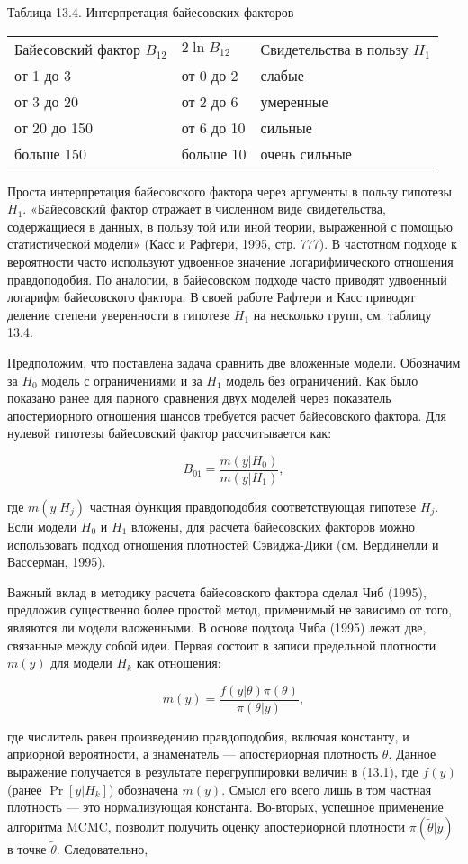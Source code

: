 Таблица 13.4. Интерпретация байесовских факторов 

\begin{tabular}{p{4cm}p{3cm}p{3cm}}
\hline 
Байесовский фактор $B_{12}$ & $2\ln B_{12}$ & Свидетельства в пользу $H_1$ \\
от 1 до 3 & от 0 до 2 & слабые \\
от 3 до 20 & от 2 до 6 & умеренные \\
от 20 до 150 & от 6 до 10 & сильные \\
больше 150 & больше 10 & очень сильные 
\end{tabular}


Проста интерпретация байесовского фактора через аргументы в пользу гипотезы $H_1$. «Байесовский фактор отражает в численном виде свидетельства, содержащиеся в данных, в пользу той или иной теории, выраженной с помощью статистической модели» (Касс и Рафтери, 1995, стр. 777). В частотном подходе к вероятности часто используют удвоенное значение логарифмического отношения правдоподобия. По аналогии, в байесовском подходе часто приводят удвоенный логарифм  байесовского фактора. В своей работе Рафтери и Касс приводят деление степени уверенности в гипотезе $H_1$ на несколько групп,  см.  таблицу 13.4.

Предположим, что поставлена задача сравнить две вложенные модели. Обозначим за $H_0$ модель с ограничениями и за $H_1$ модель без ограничений. Как было показано ранее для парного сравнения двух моделей через показатель апостериорного отношения шансов требуется расчет байесовского фактора. Для нулевой гипотезы байесовский фактор рассчитывается как:

\[
B_{01}=\frac{m(y|H_0)}{m(y|H_1)},
\]

где $m(y|H_j)$ частная функция правдоподобия соответствующая гипотезе $H_j$. Если модели $H_0$ и $H_1$ вложены, для расчета байесовских факторов можно использовать подход отношения  плотностей Сэвиджа-Дики (см. Вердинелли и Вассерман, 1995).

Важный вклад в методику расчета байесовского фактора сделал Чиб (1995), предложив существенно более простой метод, применимый не зависимо от того, являются ли модели вложенными. В основе подхода Чиба (1995) лежат две, связанные между собой идеи. Первая состоит в записи предельной плотности $m(y)$ для модели $H_k$ как отношения:

\[
m(y)=\dfrac{f(y|\theta)\pi(\theta)}{\pi(\theta|y)},
\]

где числитель равен произведению правдоподобия, включая константу, и априорной вероятности, а знаменатель --- апостериорная плотность $\theta$.
Данное выражение получается в результате перегруппировки величин в (13.1), где $f(y)$ (ранее $\Pr[y|H_k]$) обозначена $m(y)$. Смысл его всего лишь в том частная плотность --- это  нормализующая константа. Во-вторых, успешное применение алгоритма MCMC, позволит получить оценку апостериорной плотности $\pi(\tilde{\theta}|y)$ в точке $\tilde{\theta}$. Следовательно,

